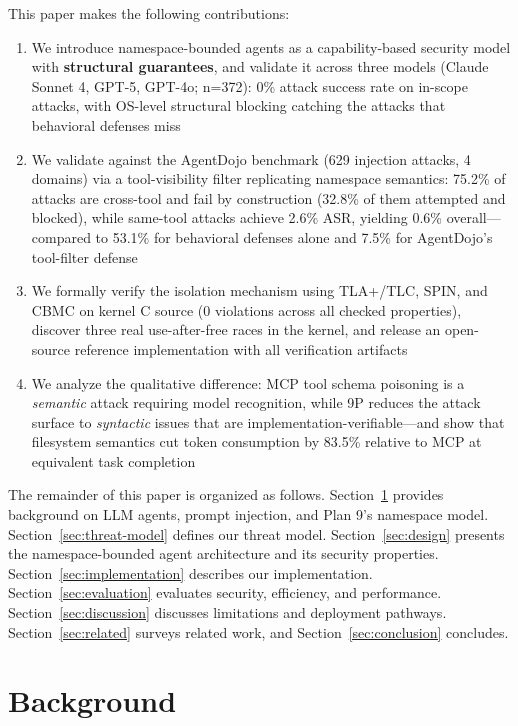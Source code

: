 \documentclass{article}
\begin{document}
This paper makes the following contributions:

\begin{enumerate}
    \item We introduce namespace-bounded agents as a capability-based security model with \textbf{structural guarantees}, and validate it across three models (Claude Sonnet 4, GPT-5, GPT-4o; n=372): 0\% attack success rate on in-scope attacks, with OS-level structural blocking catching the attacks that behavioral defenses miss
    \item We validate against the AgentDojo benchmark (629 injection attacks, 4 domains) via a tool-visibility filter replicating namespace semantics: 75.2\% of attacks are cross-tool and fail by construction (32.8\% of them attempted and blocked), while same-tool attacks achieve 2.6\% ASR, yielding 0.6\% overall---compared to 53.1\% for behavioral defenses alone and 7.5\% for AgentDojo's tool-filter defense
    \item We formally verify the isolation mechanism using TLA+/TLC, SPIN, and CBMC on kernel C source (0 violations across all checked properties), discover three real use-after-free races in the kernel, and release an open-source reference implementation with all verification artifacts
    \item We analyze the qualitative difference: MCP tool schema poisoning is a \textit{semantic} attack requiring model recognition, while 9P reduces the attack surface to \textit{syntactic} issues that are implementation-verifiable---and show that filesystem semantics cut token consumption by 83.5\% relative to MCP at equivalent task completion
\end{enumerate}

The remainder of this paper is organized as follows. Section~\ref{sec:background} provides background on LLM agents, prompt injection, and Plan 9's namespace model. Section~\ref{sec:threat-model} defines our threat model. Section~\ref{sec:design} presents the namespace-bounded agent architecture and its security properties. Section~\ref{sec:implementation} describes our implementation. Section~\ref{sec:evaluation} evaluates security, efficiency, and performance. Section~\ref{sec:discussion} discusses limitations and deployment pathways. Section~\ref{sec:related} surveys related work, and Section~\ref{sec:conclusion} concludes.

\section{Background}
\label{sec:background}
\end{document}
